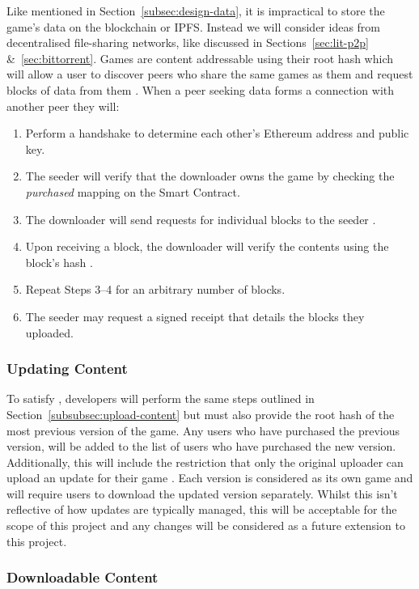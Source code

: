 Like mentioned in Section~\ref{subsec:design-data}, it is impractical to store the game's data on the blockchain or IPFS. Instead we will consider ideas from decentralised file-sharing networks, like discussed in Sections~\ref{sec:lit-p2p} \&~\ref{sec:bittorrent}.
\x
Games are content addressable using their root hash which will allow a user to discover peers who share the same games as them and request blocks of data from them . When a peer seeking data forms a connection with another peer they will:

\begin{enumerate}
  \item Perform a handshake to determine each other's Ethereum address and public key.
  \item The seeder will verify that the downloader owns the game by checking the \textit{purchased} mapping on the Smart Contract.
  \item The downloader will send requests for individual blocks to the seeder .
  \item Upon receiving a block, the downloader will verify the contents using the block's hash .
  \item Repeat Steps 3--4 for an arbitrary number of blocks.
  \item The seeder may request a signed receipt that details the blocks they uploaded.
\end{enumerate}

\subsubsection*{Updating Content}\label{subsubsec:updating}

To satisfy , developers will perform the same steps outlined in Section~\ref{subsubsec:upload-content} but must also provide the root hash of the most previous version of the game. Any users who have purchased the previous version, will be added to the list of users who have purchased the new version. Additionally, this will include the restriction that only the original uploader can upload an update for their game .
\x
Each version is considered as its own game and will require users to download the updated version separately. Whilst this isn't reflective of how updates are typically managed, this will be acceptable for the scope of this project and any changes will be considered as a future extension to this project.

\subsubsection*{Downloadable Content}

